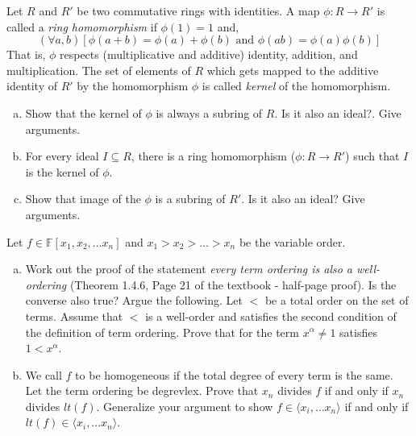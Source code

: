 \begin{ps2}
Let $R$ and $R'$ be two commutative rings with identities. A map $\phi : R \to R'$ is called a \textit{ring homomorphism} if $\phi(1) = 1$ and,
\[ (\forall a,b) \left[ \phi(a+b) = \phi(a)+\phi(b) \textrm{ and } \phi(ab) = \phi(a)\phi(b)\right] \]
That is, $\phi$ respects (multiplicative and additive) identity, addition, and multiplication. The set of elements of $R$ which gets mapped to the additive identity of $R'$ by the homomorphism $\phi$ is called \textit{kernel} of the homomorphism.
\begin{enumerate}[(a)]
\item Show that the kernel of $\phi$ is always a subring of $R$. Is it also an ideal?. Give arguments.
\item For every ideal $I \subseteq R$, there is a ring homomorphism ($\phi : R \to R'$) such that $I$ is the kernel of $\phi$.
\item Show that image of the $\phi$ is a subring of $R'$. Is it also an ideal? Give arguments.
\end{enumerate}
\end{ps2}

\begin{ps2}
Let $f \in \mathbb{F}[x_1,x_2, \ldots x_n]$ and $x_1 > x_2 > \ldots > x_n$ be the variable order.
\begin{enumerate}[(a)]
\item Work out the proof of the statement \textit{every term ordering is also a well-ordering} (Theorem 1.4.6, Page 21 of the textbook - half-page proof). Is the converse also true? Argue the following.
 Let $<$ be a total order on the set of terms. Assume that $<$ is a well-order and satisfies the second condition of the definition of term ordering. Prove that for the term $x^\alpha \ne 1$ satisfies $1 < x^\alpha$.
\item We call $f$ to be homogeneous if the total degree of every term is the same. Let the term ordering be degrevlex. Prove that $x_n$ divides $f$ if and only if $x_n$ divides $lt(f)$. Generalize your argument to show $f \in \langle x_i, \ldots x_n \rangle$ if and only if $lt(f) \in \langle x_i, \ldots x_n \rangle$.
\end{enumerate}
\end{ps2}


